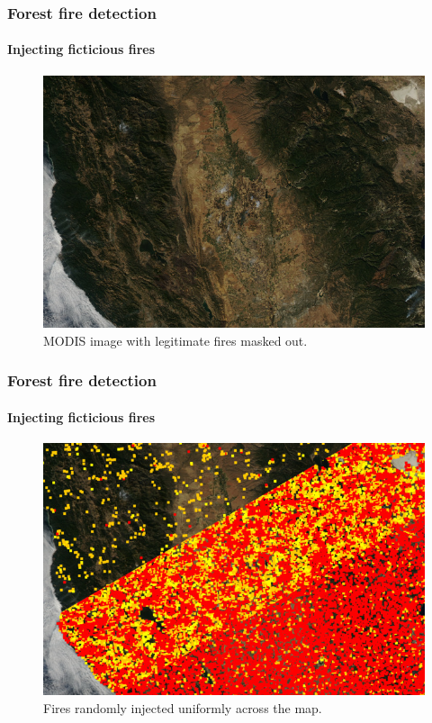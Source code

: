\documentclass{beamer}
\begin{document}
\begin{frame}
  \frametitle{Forest fire detection}
  \framesubtitle{Injecting ficticious fires}

  \begin{figure}
    \includegraphics[width=\textwidth]{images/injection/masked_0.jpg}
    \caption{MODIS image with legitimate fires masked out.}
    \label{fig:injection-masked}
  \end{figure}
\end{frame}

\begin{frame}
  \frametitle{Forest fire detection}
  \framesubtitle{Injecting ficticious fires}

  \begin{figure}
    \includegraphics[width=\textwidth]{images/injection/random_combined_diagonal.jpg}
    \caption{Fires randomly injected uniformly across the map.}
    \label{fig:injection-random}
  \end{figure}
\end{frame}
\end{document}
